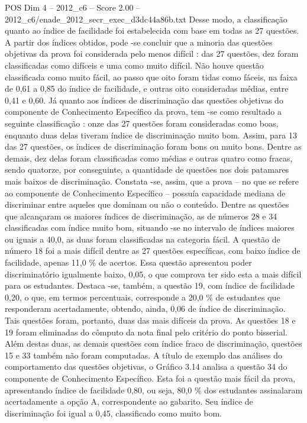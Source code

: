 \begin{textsample}{POS Dim 4 – 2012\_c6 – Score 2.00 – 2012\_c6/enade\_2012\_secr\_exec\_d3dc44a86b.txt}
Desse modo, a classificação quanto ao índice de facilidade foi estabelecida com base em todas as 27 questões.
A partir dos índices obtidos, pode -se concluir que a minoria das questões objetivas da prova foi considerada pelo menos difícil : das 27 questões, dez foram classificadas como difíceis e uma como muito difícil.
Não houve questão classificada como muito fácil, ao passo que oito foram tidas como fáceis, na faixa de 0,61 a 0,85 do índice de facilidade, e outras oito consideradas médias, entre 0,41 e 0,60.
Já quanto aos índices de discriminação das questões objetivas do componente de Conhecimento Específico da prova, tem -se como resultado a seguinte classificação : onze das 27 questões foram consideradas como boas, enquanto duas delas tiveram índice de discriminação muito bom.
Assim, para 13 das 27 questões, os índices de discriminação foram bons ou muito bons.
Dentre as demais, dez delas foram classificadas como médias e outras quatro como fracas, sendo quatorze, por conseguinte, a quantidade de questões nos dois patamares mais baixos de discriminação.
Constata -se, assim, que a prova – no que se refere ao componente de Conhecimento Específico – possuía capacidade mediana de discriminar entre aqueles que dominam ou não o conteúdo.
Dentre as questões que alcançaram os maiores índices de discriminação, as de números 28 e 34 classificadas com índice muito bom, situando -se no intervalo de índices maiores ou iguais a 40,0, as duas foram classificadas na categoria fácil.
A questão de número 18 foi a mais difícil dentre as 27 questões específicas, com baixo índice de facilidade, apenas 11,0 \% de acertos.
Essa questão apresentou poder discriminatório igualmente baixo, 0,05, o que comprova ter sido esta a mais difícil para os estudantes.
Destaca -se, também, a questão 19, com índice de facilidade 0,20, o que, em termos percentuais, corresponde a 20,0 \% de estudantes que responderam acertadamente, obtendo, ainda, 0,06 de índice de discriminação.
Tais questões foram, portanto, duas das mais difíceis da prova.
As questões 18 e 19 foram eliminadas do cômputo da nota final pelo critério do ponto bisserial.
Além destas duas, as demais questões com índice fraco de discriminação, questões 15 e 33 também não foram computadas.
A título de exemplo das análises do comportamento das questões objetivas, o Gráfico 3.14 analisa a questão 34 do componente de Conhecimento Específico.
Esta foi a questão mais fácil da prova, apresentando índice de facilidade 0,80, ou seja, 80,0 \% dos estudantes assinalaram acertadamente a opção A, correspondente ao gabarito.
Seu índice de discriminação foi igual a 0,45, classificado como muito bom.

\end{textsample}

